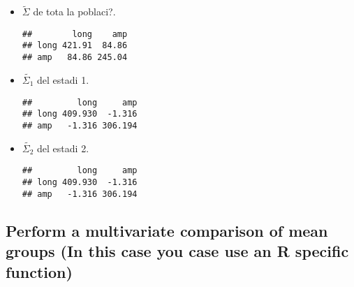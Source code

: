 \documentclass[a4paper,titlepage,12pt]{article}\usepackage[]{graphicx}\usepackage[]{color}
\makeatletter
\newenvironment{kframe}{%
 \def\at@end@of@kframe{}%
 \ifinner\ifhmode%
  \def\at@end@of@kframe{\end{minipage}}%
  \begin{minipage}{\columnwidth}%
 \fi\fi%
 \def\FrameCommand##1{\hskip\@totalleftmargin \hskip-\fboxsep
 \colorbox{shadecolor}{##1}\hskip-\fboxsep
     \hskip-\linewidth \hskip-\@totalleftmargin \hskip\columnwidth}%
 \MakeFramed {\advance\hsize-\width
   \@totalleftmargin\z@ \linewidth\hsize
   \@setminipage}}%
 {\par\unskip\endMakeFramed%
 \at@end@of@kframe}
\newenvironment{knitrout}{}{} %
\makeatother
\begin{document}
\begin{itemize}
\item $\tilde{\Sigma}$   de tota la poblaci?.
\begin{knitrout}
\color{fgcolor}\begin{kframe}
\begin{verbatim}
##        long    amp
## long 421.91  84.86
## amp   84.86 245.04
\end{verbatim}
\end{kframe}
\end{knitrout}

\newpage
\item$\tilde{\Sigma_1}$  del estadi 1.
\begin{knitrout}
\color{fgcolor}\begin{kframe}
\begin{verbatim}
##         long     amp
## long 409.930  -1.316
## amp   -1.316 306.194
\end{verbatim}
\end{kframe}
\end{knitrout}


\item $\tilde{\Sigma_2}$  del estadi 2.
\begin{knitrout}
\color{fgcolor}\begin{kframe}
\begin{verbatim}
##         long     amp
## long 409.930  -1.316
## amp   -1.316 306.194
\end{verbatim}
\end{kframe}
\end{knitrout}

\end{itemize}

\subsection{Perform a multivariate comparison of mean groups (In this case you case use an R specific function)}
\end{document}
